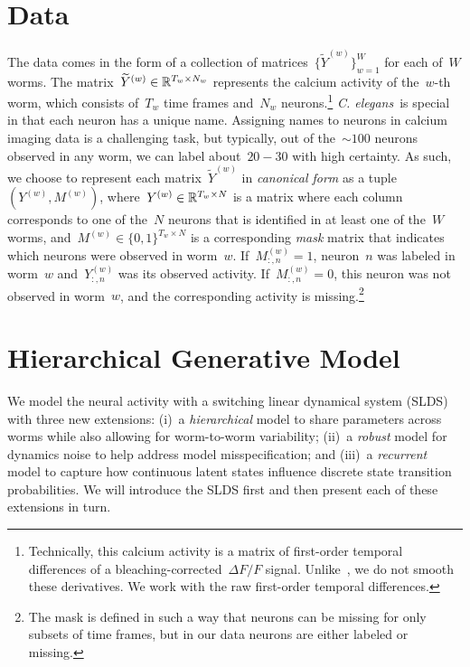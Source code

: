 \documentclass{article}
\newcommand{\celegans}{\textit{C. elegans}}
\begin{document}
\section{Data}
\label{sec:data}

The data comes in the form of a collection of matrices~$\{\widetilde{Y}^{(w)}\}_{w=1}^W$
for each of~$W$ worms.  The matrix~${\widetilde{Y}^{(w)} \in \mathbb{R}^{T_w \times N_w}}$
represents the calcium activity of the~$w$-th worm, which consists of~$T_w$
time frames and~$N_w$ neurons.\footnote{Technically, this calcium activity is
a matrix of first-order temporal differences of a
bleaching-corrected~$\Delta F /F$ signal. Unlike~\citet{kato2015global}, we
do not smooth these derivatives. We work with the raw first-order
temporal differences.}  \celegans~is special in that each neuron has a unique
name.  Assigning names to neurons in calcium imaging data is a challenging
task, but typically, out of the~${\sim 100}$ neurons observed in any worm,
we can label about~$20-30$ with high certainty.  As such, we choose to
represent each matrix~$\widetilde{Y}^{(w)}$ in \emph{canonical form} as a
tuple~$(Y^{(w)}, M^{(w)})$, where~${Y^{(w)} \in \mathbb{R}^{T_w \times N}}$ is
a matrix where each column corresponds to one of the~$N$ neurons that is
identified in at least one of the~$W$ worms, and~${M^{(w)} \in \{0,1\}^{T_w \times N}}$
is a corresponding \emph{mask} matrix that indicates which neurons were
observed in worm~$w$.  If~$M_{:,n}^{(w)} = 1$, neuron~$n$ was labeled in
worm~$w$ and~$Y_{:,n}^{(w)}$ was its observed activity.  If~$M_{:,n}^{(w)}=0$,
this neuron was not observed in worm~$w$, and the corresponding activity
is missing.\footnote{The mask is defined in such a way that neurons can
  be missing for only subsets of time frames, but in our data neurons are
  either labeled or missing.}

\section{Hierarchical Generative Model}

We model the neural activity with a switching linear
dynamical system (SLDS) with three new extensions: (i)~a \emph{hierarchical} model
to share parameters across worms while also allowing for worm-to-worm
variability; (ii)~a \emph{robust} model for dynamics noise to help address
model misspecification; and (iii)~a \emph{recurrent} model to capture
how continuous latent states influence discrete state transition probabilities.
We will introduce the SLDS first and then present each of these extensions
in turn.
\end{document}
